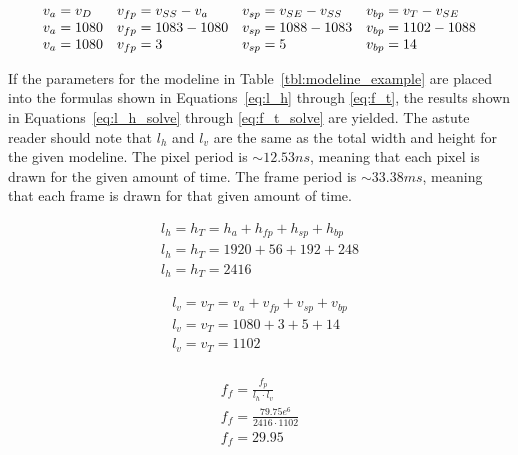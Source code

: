     \begin{equation}
        \begin{array}{ l l l l }
            \displaystyle
            v_a=v_D & v_{fp}=v_{SS}-v_a & v_{sp}=v_{SE}-v_{SS} & v_{bp}=v_T-v_{SE} \\
            v_a=1080 & v_{fp}=1083-1080 & v_{sp}=1088-1083 & v_{bp}=1102-1088 \\
            v_a=1080 & v_{fp}=3 & v_{sp}=5 & v_{bp}=14
        \end{array}
        \label{eq:v_a_solve}
    \end{equation}

    If the parameters for the modeline in Table~\ref{tbl:modeline_example} are placed into the formulas shown in Equations~\eqref{eq:l_h} through \eqref{eq:f_t}, the results shown in Equations~\eqref{eq:l_h_solve} through \eqref{eq:f_t_solve} are yielded. The astute reader should note that $l_h$ and $l_v$ are the same as the total width and height for the given modeline. The pixel period is $\sim12.53 ns$, meaning that each pixel is drawn for the given amount of time. The frame period is $\sim33.38 ms$, meaning that each frame is drawn for that given amount of time.

    \begin{equation}
        \begin{array}{ l }
            \displaystyle l_h=h_T=h_a+h_{fp}+h_{sp}+h_{bp} \\
            \displaystyle l_h=h_T=1920+56+192+248 \\
            \displaystyle l_h=h_T=2416
            \label{eq:l_h_solve}
        \end{array}
    \end{equation}

    \begin{equation}
        \begin{array}{ l }
            \displaystyle l_v=v_T=v_a+v_{fp}+v_{sp}+v_{bp} \\
            \displaystyle l_v=v_T=1080+3+5+14 \\
            \displaystyle l_v=v_T=1102 \\[11pt]
        \end{array}
        \label{eq:l_v_solve}
    \end{equation}

    \begin{equation}
        \begin{array}{ l }
            \displaystyle f_f={\frac{f_p}{l_h \cdot l_v}} \\[11pt]
            \displaystyle f_f={\frac{79.75e^6}{2416 \cdot 1102}} \\[11pt]
            \displaystyle f_f={29.95} \\[11pt]
        \end{array}
        \label{eq:f_f_solve}
    \end{equation}

